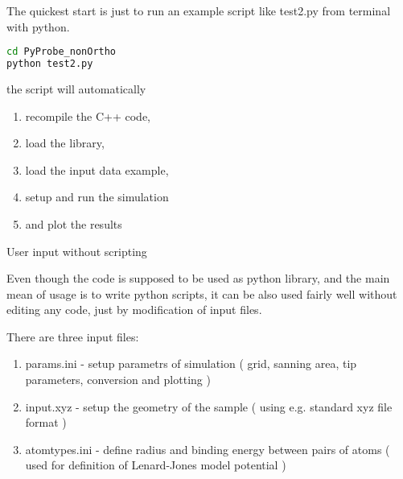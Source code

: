 The quickest start is just to run an example script like test2.py from terminal with python.
\begin{shadedbox}
    \begin{lstlisting}[language=bash]
cd PyProbe_nonOrtho
python test2.py
    \end{lstlisting}
\end{shadedbox}


the script will automatically
\begin{enumerate}
\item   recompile the C++ code,
\item   load the library,
\item   load the input data example,
\item   setup and run the simulation
\item   and plot the results
\end{enumerate}

User input without scripting

Even though the code is supposed to be used as python library, and the main mean
of usage is to write python scripts, it can be also used fairly well without
editing any code, just by modification of input files. 

There are three input files:
\begin{enumerate}

    \item params.ini - setup parametrs of simulation ( grid, sanning area, tip parameters, conversion and plotting )
    \item input.xyz - setup the geometry of the sample ( using e.g. standard xyz file format )
    \item atomtypes.ini - define radius and binding energy between pairs of atoms ( used for definition of Lenard-Jones model potential )

\end{enumerate}
